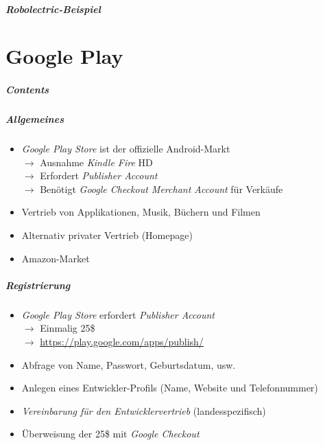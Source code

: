 \begin{frame}
	\frametitle{Robolectric-Beispiel}
	
\end{frame}

\part{Google Play}
\frame{\partpage}
\begin{frame}
	\frametitle{Contents}
	\tableofcontents[]
\end{frame}

\begin{frame}
	\frametitle{Allgemeines}
	\begin{itemize}
		\item \emph{Google Play Store} ist der offizielle Android-Markt\\
			$\rightarrow$ Ausnahme \emph{Kindle Fire} HD\\
			$\rightarrow$ Erfordert \emph{Publisher Account}\\
			$\rightarrow$ Benötigt \emph{Google Checkout Merchant Account} für Verkäufe
		\item Vertrieb von Applikationen, Musik, Büchern und Filmen
		\item Alternativ privater Vertrieb (Homepage)
		\item Amazon-Market
	\end{itemize}
\end{frame}

\begin{frame}
	\frametitle{Registrierung}
	\begin{itemize}
		\item \emph{Google Play Store} erfordert \emph{Publisher Account}\\
			$\rightarrow$ Einmalig 25\$\\
			$\rightarrow$ \href{https://play.google.com/apps/publish/}{https://play.google.com/apps/publish/} 
		\item Abfrage von Name, Passwort, Geburtsdatum, usw.
		\item Anlegen eines Entwickler-Profils (Name, Website und Telefonnummer)
		\item \emph{Vereinbarung für den Entwicklervertrieb} (landesspezifisch)
		\item Überweisung der 25\$ mit \emph{Google Checkout}
	\end{itemize}
\end{frame}

